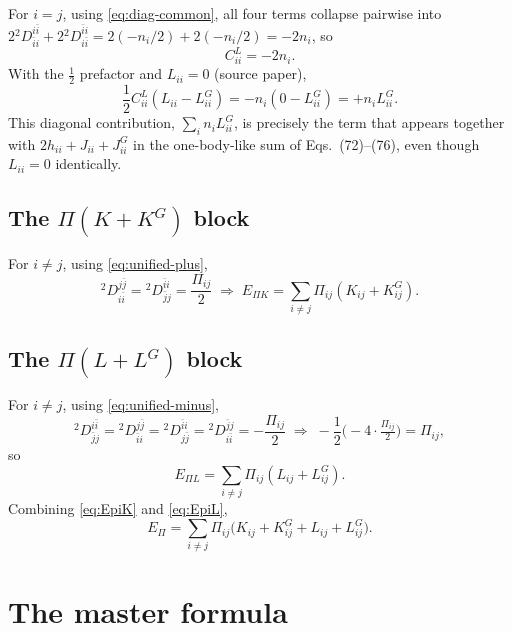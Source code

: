 \documentclass[11pt,a4paper]{article}
\newcommand{\Dtwo}{{}^2D}
\newcommand{\PiMat}{\Pi}
\begin{document}
For $i=j$, using \eqref{eq:diag-common}, all four terms collapse
pairwise into $2\Dtwo^{i\bar i}_{\bar ii}+2\Dtwo^{\bar ii}_{i\bar i}
=2(-n_i/2)+2(-n_i/2)=-2n_i$, so
\begin{equation}
C^L_{ii}=-2n_i .
\label{eq:CLdiag}
\end{equation}
With the $\tfrac12$ prefactor and $L_{ii}=0$ (source paper),
\begin{equation}
\frac12C^L_{ii}(L_{ii}-L^G_{ii})
=-n_i(0-L^G_{ii})
=+n_iL^G_{ii}.
\label{eq:ELdiag}
\end{equation}
This diagonal contribution, $\sum_in_iL^G_{ii}$, is precisely the
term that appears together with $2h_{ii}+J_{ii}+J^G_{ii}$ in the
one-body-like sum of Eqs.~(72)--(76), even though $L_{ii}=0$
identically.

\subsection{The $\PiMat(K+K^G)$ block}
For $i\neq j$, using \eqref{eq:unified-plus},
\begin{equation}
\Dtwo^{j\bar j}_{i\bar i}=\Dtwo^{\bar ii}_{\bar jj}=\frac{\PiMat_{ij}}{2}
\;\Longrightarrow\;
E_{\PiMat K}=\sum_{i\neq j}\PiMat_{ij}(K_{ij}+K^G_{ij}).
\label{eq:EpiK}
\end{equation}

\subsection{The $\PiMat(L+L^G)$ block}
For $i\neq j$, using \eqref{eq:unified-minus},
\begin{equation}
\Dtwo^{i\bar i}_{\bar jj}=\Dtwo^{j\bar j}_{\bar ii}=\Dtwo^{\bar ii}_{j\bar j}
=\Dtwo^{\bar jj}_{i\bar i}=-\frac{\PiMat_{ij}}{2}
\;\Longrightarrow\;
-\frac12\big(-4\cdot\tfrac{\PiMat_{ij}}{2}\big)=\PiMat_{ij},
\end{equation}
so
\begin{equation}
E_{\PiMat L}=\sum_{i\neq j}\PiMat_{ij}(L_{ij}+L^G_{ij}).
\label{eq:EpiL}
\end{equation}
Combining \eqref{eq:EpiK} and \eqref{eq:EpiL},
\begin{equation}
E_\PiMat=\sum_{i\neq j}\PiMat_{ij}\big(K_{ij}+K^G_{ij}+L_{ij}+L^G_{ij}\big).
\label{eq:Epi}
\end{equation}

\section{The master formula}
\label{sec:master}
\end{document}
